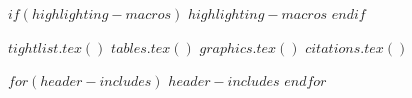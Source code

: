 $if(highlighting-macros)$
$highlighting-macros$
$endif$

$tightlist.tex()$
$tables.tex()$
$graphics.tex()$
$citations.tex()$

$for(header-includes)$
$header-includes$
$endfor$

\usepackage{fancyhdr}
\fancyhf{} %

\fancyfoot[R]{\thepage/\pageref{LastPage}}
\renewcommand{\headrulewidth}{0.4pt}
\renewcommand{\footrulewidth}{0.4pt}
\pagestyle{fancy}
